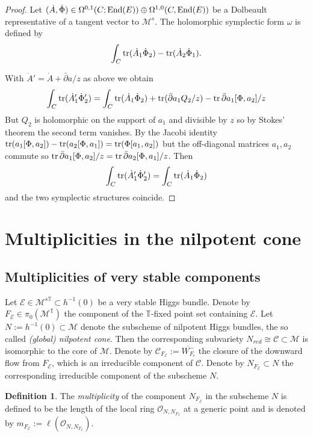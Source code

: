 \documentclass[12pt]{article}
\numberwithin{equation}{section}
\theoremstyle{remark}
\theoremstyle{definition}
\newtheorem{definition}[theorem]{Definition}
\numberwithin{theorem}{section}
\def\calE{{\mathcal E}}
\def\M{{\mathcal{M}}}
\newcommand{\T}{{\mathbb{T}}}
\def\calC{{\mathcal C}}
\def\calO{{\mathcal O}}
\newcommand{\End}{\textnormal{End}}
\newcommand{\tr}{\textnormal{tr}}
\renewcommand{\1}{\mathbbm{1}}
\begin{document}
\begin{proof}
	
	
	Let $(\dot A, \dot \Phi)\in \Omega^{0,1}(C;\End (E))\oplus \Omega^{1,0}(C,\End (E))$ be a Dolbeault representative of a tangent vector to ${\mathcal M}^s$. The holomorphic symplectic form $\omega$ is defined by
	$$\int_C\tr(\dot A_1\dot\Phi_2)-\tr(\dot A_2\dot\Phi_1).$$
	
	
	
	With $\dot A'=\dot A+\bar\partial  a/z$ as above we obtain
	$$ \int_C\tr(\dot A'_1\dot\Phi'_2)= \int_C\tr(\dot A_1\dot\Phi_2)+\tr (\bar\partial  a_1Q_2/z)-\tr \,\bar\partial  a_1[\Phi,a_2]/z$$
	But $Q_2$ is holomorphic on the support of $ a_1$ and divisible by $z$ so by Stokes' theorem the second term vanishes. By the Jacobi identity 
	$\tr (a_1[\Phi,a_2])-\tr (a_2[\Phi,a_1])=\tr (\Phi[a_1,a_2])$ but the off-diagonal matrices $a_1,a_2$ commute so  $\tr\, \bar\partial  a_1[\Phi,a_2]/z=\tr \,\bar\partial  a_2[\Phi,a_1]/z$.
	Then
	$$ \int_C\tr(\dot A'_1\dot\Phi'_2)= \int_C\tr(\dot A_1\dot\Phi_2)$$
	and the two symplectic structures coincide. 
\end{proof}









\section{Multiplicities in the nilpotent cone}
\label{multiplicities}

\subsection{Multiplicities of very stable components}
Let $\calE\in \M^{s \T}\subset h^{-1}(0)$ be a very stable Higgs bundle. Denote by $F_\calE\in \pi_{0}(\M^{ \T})$ the component of the $\T$-fixed point set containing $\calE$.   Let $N:=h^{-1}(0)\subset \M$ denote the subscheme of nilpotent Higgs bundles, the so called {\em (global) nilpotent cone}. Then the corresponding subvariety $N_{red}\cong \calC\subset \M$ is isomorphic to the core of $\M$. Denote by $\calC_{F_{\calE}}:= \overline{W^-_{F_\epsilon}}$ the closure of the downward flow from $F_\calE$, which is an irreducible component of $\calC$. Denote by $N_{F_{\calE}}\subset N$ the corresponding irreducible component of the subscheme $N$.  

\begin{definition} \label{defmult} The {\em multiplicity} of the component $N_{F_\calE}$   in the subscheme $N$ is defined to be the length of the local ring $\calO_{N,N_{{F_\calE}}}$ at a generic point  and is  denoted by $m_{F_\calE}:=\ell(\calO_{N,N_{{F_\calE}}})$.   
\end{definition}
\end{document}
